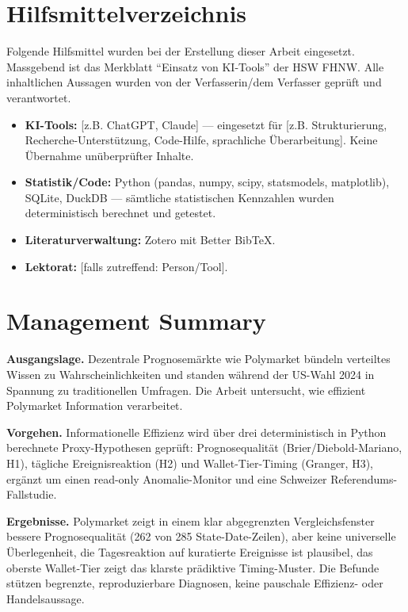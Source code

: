 \documentclass[11pt,a4paper]{report}
\begin{document}
\chapter*{Hilfsmittelverzeichnis}
Folgende Hilfsmittel wurden bei der Erstellung dieser Arbeit eingesetzt. Massgebend
ist das Merkblatt ``Einsatz von KI-Tools'' der HSW FHNW. Alle inhaltlichen Aussagen
wurden von der Verfasserin/dem Verfasser geprüft und verantwortet.

\begin{itemize}
  \item \textbf{KI-Tools:} [z.B. ChatGPT, Claude] --- eingesetzt für [z.B.
  Strukturierung, Recherche-Unterstützung, Code-Hilfe, sprachliche Überarbeitung].
  Keine Übernahme unüberprüfter Inhalte.
  \item \textbf{Statistik/Code:} Python (pandas, numpy, scipy, statsmodels,
  matplotlib), SQLite, DuckDB --- sämtliche statistischen Kennzahlen wurden
  deterministisch berechnet und getestet.
  \item \textbf{Literaturverwaltung:} Zotero mit Better BibTeX.
  \item \textbf{Lektorat:} [falls zutreffend: Person/Tool].
\end{itemize}

\chapter*{Management Summary}
\textbf{Ausgangslage.} Dezentrale Prognosemärkte wie Polymarket bündeln
verteiltes Wissen zu Wahrscheinlichkeiten und standen während der US-Wahl 2024 in
Spannung zu traditionellen Umfragen. Die Arbeit untersucht, wie effizient
Polymarket Information verarbeitet.

\textbf{Vorgehen.} Informationelle Effizienz wird über drei deterministisch in
Python berechnete Proxy-Hypothesen geprüft: Prognosequalität (Brier/Diebold-Mariano,
H1), tägliche Ereignisreaktion (H2) und Wallet-Tier-Timing (Granger, H3), ergänzt
um einen read-only Anomalie-Monitor und eine Schweizer Referendums-Fallstudie.

\textbf{Ergebnisse.} Polymarket zeigt in einem klar abgegrenzten Vergleichsfenster
bessere Prognosequalität (262 von 285 State-Date-Zeilen), aber keine universelle
Überlegenheit, die Tagesreaktion auf kuratierte Ereignisse ist plausibel, das
oberste Wallet-Tier zeigt das klarste prädiktive Timing-Muster. Die Befunde
stützen begrenzte, reproduzierbare Diagnosen, keine pauschale Effizienz- oder
Handelsaussage.
\end{document}
